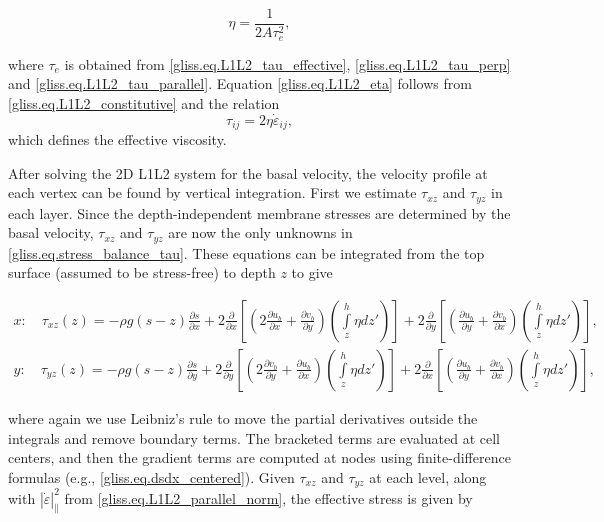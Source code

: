 {\begin{equation}
  \label{gliss.eq.L1L2_eta}
  \eta  = \frac{1}{2A \tau_{e}^{2}},
\end{equation}

\noindent
where $\tau_{e}$ is obtained from \eqref{gliss.eq.L1L2_tau_effective},
\eqref{gliss.eq.L1L2_tau_perp} and \eqref{gliss.eq.L1L2_tau_parallel}.
Equation \eqref{gliss.eq.L1L2_eta} follows from \eqref{gliss.eq.L1L2_constitutive}
and the relation 
\begin{equation}
  \label{gliss.eq.L1L2_eta2}
  {\tau_{ij}} = 2\eta {\dot{\varepsilon}_{ij}},
\end{equation} 
which defines the effective viscosity.

After solving the 2D L1L2 system for the basal velocity, the velocity profile at each vertex
can be found by vertical integration. First we estimate
$\tau_{xz}$ and $\tau_{yz}$ in each layer.  Since the depth-independent membrane stresses
are determined by the basal velocity, $\tau_{xz}$ and $\tau_{yz}$ are now the
only unknowns in \eqref{gliss.eq.stress_balance_tau}.  These equations can be integrated
from the top surface (assumed to be stress-free) to depth $z$ to give

\begin{equation}
  \begin{split}
    x: \quad {{\tau }_{xz}}(z) = -\rho g(s-z)\frac{\partial s}{\partial x} 
    + 2\frac{\partial }{\partial x}\left[ \left( 2\frac{\partial {{u}_{b}}}{\partial x}+\frac{\partial {{v}_{b}}}{\partial y} \right)
      \left( \int\limits_{z}^{h}{\eta d{z}'} \right) \right] 
    + 2\frac{\partial }{\partial y}\left[ \left(  \frac{\partial {{u}_{b}}}{\partial y}+\frac{\partial {{v}_{b}}}{\partial x} \right)
      \left( \int\limits_{z}^{h}{\eta d{z}'} \right) \right], \\
    y: \quad {{\tau }_{yz}}(z) = -\rho g(s-z)\frac{\partial s}{\partial y} 
    + 2\frac{\partial }{\partial y}\left[ \left( 2\frac{\partial {{v}_{b}}}{\partial y}+\frac{\partial {{u}_{b}}}{\partial x} \right)
      \left( \int\limits_{z}^{h}{\eta d{z}'} \right) \right] 
    + 2\frac{\partial }{\partial x}\left[ \left(  \frac{\partial {{u}_{b}}}{\partial y}+\frac{\partial {{v}_{b}}}{\partial x} \right)
      \left( \int\limits_{z}^{h}{\eta d{z}'} \right) \right],
  \end{split}
\end{equation}

\noindent
where again we use Leibniz's rule to move the partial derivatives outside the integrals
and remove boundary terms.
The bracketed terms are evaluated at cell centers, and then the gradient terms are 
computed at nodes using finite-difference formulas (e.g., \eqref{gliss.eq.dsdx_centered}).
Given $\tau_{xz}$ and $\tau_{yz}$ at each level, along with
$\left| \dot{\varepsilon } \right|_{\parallel }^{2}$ from \eqref{gliss.eq.L1L2_parallel_norm},
the effective stress is given by

}
